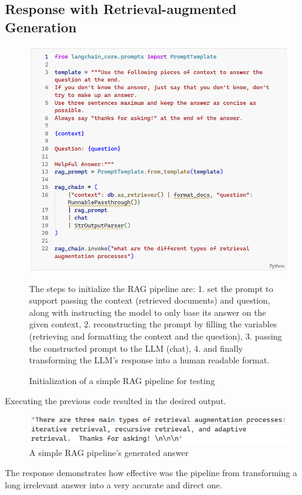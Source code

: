 \subsection{Response with Retrieval-augmented Generation}
\begin{figure}[H]
    \centering
    \includegraphics[width=.9\linewidth]{./figures/rag-code.png}
    \caption{Initialization of a simple RAG pipeline for testing}
    \begin{flushleft}
        \small The steps to initialize the RAG pipeline are: 1. set the prompt to support passing the context (retrieved documents) and question, along with instructing the model to only base its answer on the given context, 2. reconstructing the prompt by filling the variables (retrieving and formatting the context and the question), 3. passing the constructed prompt to the LLM (chat), 4. and finally transforming the LLM's response into a human readable format.
    \end{flushleft}
\end{figure}
Executing the previous code resulted in the desired output.
\begin{figure}[H]
    \centering
    \includegraphics[width=\linewidth]{./figures/rag-answer.png}
    \caption{A simple RAG pipeline's generated answer}
\end{figure}
The response demonstrates how effective was the pipeline from transforming a long irrelevant answer into a very accurate and direct one.

